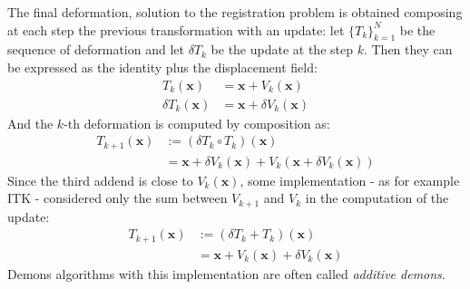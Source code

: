 The final deformation, solution to the registration problem is obtained composing at each step the previous transformation with an update: let $\{T_{k}\}_{k=1}^{N}$ be the sequence of deformation and let $\delta T_{k}$ be the update at the step $k$. Then they can be expressed as the identity plus the displacement field:
\begin{align*}
	T_{k}(\mathbf{x}) &= \mathbf{x} + V_{k}(\mathbf{x}) \\ 
	\delta T_{k}(\mathbf{x}) &= \mathbf{x} + \delta V_{k}(\mathbf{x}) 
\end{align*}
And the $k$-th deformation is computed by composition as:
\begin{align*}
T_{k+1}(\mathbf{x})  &:= (\delta T_{k}\circ T_{k})(\mathbf{x}) \\
&= \mathbf{x} + \delta V_{k}(\mathbf{x}) + V_{k}(\mathbf{x} + \delta V_{k}(\mathbf{x}))
\end{align*}
Since the third addend is close to $V_{k}(\mathbf{x})$, some implementation - as for example ITK - considered only the sum between 
$ V_{k+1}$ and $V_{k}$ in the computation of the update:
\begin{align*}
T_{k+1}(\mathbf{x})  &:= (\delta T_{k} + T_{k})(\mathbf{x}) \\
&= \mathbf{x} + V_{k}(\mathbf{x}) + \delta V_{k}(\mathbf{x})
\end{align*}
Demons algorithms with this implementation are often called \emph{additive demons}.\\

